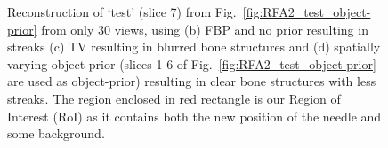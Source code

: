 \documentclass[journal]{IEEEtran}
\begin{document}
\begin{figure}[!h]
\centering
{}\hfill
{}\hfill
{}\hfill
{}
\caption{\small{ Reconstruction of `test' (slice 7) from Fig.~\ref{fig:RFA2_test_object-prior} from only 30 views, using (b) FBP and no prior resulting in streaks (c) TV resulting in blurred bone structures and (d) spatially varying object-prior (slices 1-6 of Fig.~\ref{fig:RFA2_test_object-prior} are used as object-prior) resulting in clear bone structures with less streaks. The region enclosed in red rectangle is our Region of Interest (RoI) as it contains both the new position of the needle and some background.}}
\label{fig:tmh_2D_results}
\end{figure}
\end{document}
